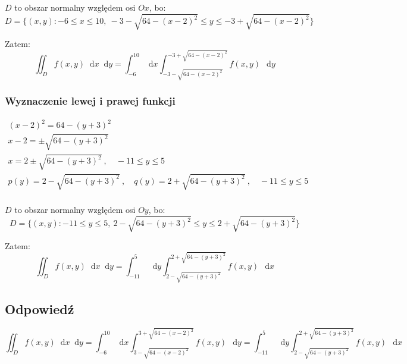 \documentclass{article}
\newcommand{\diff}{\mathop{}\!\mathrm{d}}
\newcommand{\Integral}[4]{\int_{#1}^{#2} \! #3 \, \mathop{}\!\mathrm{d}#4}
\DeclareMathOperator{\?}{?}
\begin{document}
$D$ to obszar normalny względem osi $Ox$, bo:
\begin{equation*}
   D = \{ (x,y) : -6 \le x \le 10,\ -3 - \sqrt{64 - (x - 2)^2} \le y \le -3 + \sqrt{64 - (x - 2)^2} \}
\end{equation*}

Zatem:
\begin{equation*}
   \iint_D f(x,y) \diff{x}\diff{y} = \Integral{-6}{10}{}{x} \Integral{-3 - \sqrt{64 - (x - 2)^2}}{-3 + \sqrt{64 - (x - 2)^2}}{f(x,y)}{y}
\end{equation*}

\subsubsection*{Wyznaczenie lewej i prawej funkcji}

\begin{equation*}
   \begin{gathered}
      (x - 2)^2 = 64 - (y + 3)^2 \\
      x - 2 = \pm\sqrt{64 - (y + 3)^2} \\
      x = 2 \pm \sqrt{64 - (y + 3)^2}\ , \quad -11 \le y \le 5 \\
      p(y) = 2 - \sqrt{64 - (y + 3)^2}\ , \quad q(y) = 2 + \sqrt{64 - (y + 3)^2}\ , \quad -11 \le y \le 5 \\
   \end{gathered}
\end{equation*}

$D$ to obszar normalny względem osi $Oy$, bo:
\begin{equation*}
   D = \{ (x,y) : -11 \le y \le 5,\ 2 - \sqrt{64 - (y + 3)^2} \le y \le 2 + \sqrt{64 - (y + 3)^2} \}
\end{equation*}

Zatem:
\begin{equation*}
   \iint_D f(x,y) \diff{x}\diff{y} = \Integral{-11}{5}{}{y} \Integral{2 - \sqrt{64 - (y + 3)^2}}{2 + \sqrt{64 - (y + 3)^2}}{f(x,y)}{x}
\end{equation*}

\subsection*{Odpowiedź}
\begin{equation*}
   \iint_D f(x,y) \diff{x}\diff{y} = \Integral{-6}{10}{}{x} \Integral{3 - \sqrt{64 - (x - 2)^2}}{3 + \sqrt{64 - (x - 2)^2}}{f(x,y)}{y}
    = \Integral{-11}{5}{}{y} \Integral{2 - \sqrt{64 - (y + 3)^2}}{2 + \sqrt{64 - (y + 3)^2}}{f(x,y)}{x}
\end{equation*}
\end{document}
